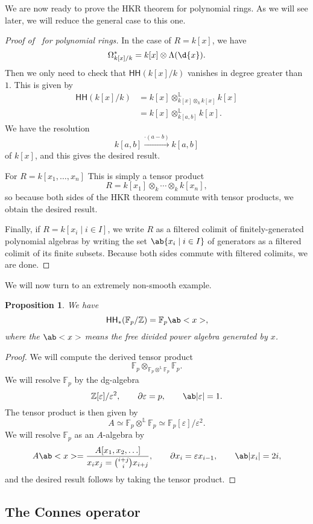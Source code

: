 \documentclass[10pt, oneside]{memoir}
\newtheorem{prop}[thm]{Proposition}
\theoremstyle{definition}
\theoremstyle{remark}
\theoremstyle{plain}
\theoremstyle{definition}
\theoremstyle{remark}
\newcommand{\Z}{\mathbb{Z}}
\newcommand{\F}{\mathbb{F}}
\renewcommand{\L}{\mathbb{L}}
\newcommand{\ep}{\varepsilon}
\newcommand{\ms}[1]{\mathsf{#1}}
\newcommand{\1}{\mathbf{1}}
\newcommand{\2}{\mathbf{2}}
\newcommand{\3}{\mathbf{3}}
\newcommand{\HH}{\ms{HH}}
\begin{document}
We are now ready to prove the HKR theorem for polynomial rings. As we will see later, we will reduce the general case to this one.
\begin{proof}[Proof of~ for polynomial rings]
    In the case of $R = k[x]$, we have
    \[ \Omega^*_{k[x]/k} = k[x] \otimes \Lambda(\d{x}). \]
    Then we only need to check that $\HH(k[x]/k)$ vanishes in degree greater than $1$. This is given by
    \begin{align*}
        \HH(k[x]/k) &= k[x] \otimes^{\L}_{k[x] \otimes_k k[x]} k[x] \\
        &= k[x] \otimes_{k[a,b]}^{\L} k[x].
    \end{align*}
    We have the resolution
    \[ k[a,b] \xrightarrow{\cdot (a-b)} k[a,b] \]
    of $k[x]$, and this gives the desired result.

    For \(R = k[x_1, \ldots, x_n]\) This is simply a tensor product
    \[ R = k[x_1] \otimes_k \cdots \otimes_k k[x_n], \]
    so because both sides of the HKR theorem commute with tensor products, we obtain the desired result.

    Finally, if \(R = k[x_i \mid i \in I]\), we write \(R\) as a filtered colimit of finitely-generated polynomial algebras by writing the set $\ab\{x_i \mid i \in I\}$ of generators as a filtered colimit of its finite subsets. Because both sides commute with filtered colimits, we are done.
\end{proof}

We will now turn to an extremely non-smooth example.
\begin{prop}
    We have
    \[ \HH_*(\F_p/\Z) = \F_p \ab<x>, \]
    where the $\ab<x>$ means the free divided power algebra generated by $x$.
\end{prop}

\begin{proof}
    We will compute the derived tensor product
    \[ \F_p \otimes_{\F_p \otimes^{\L} \F_p} \F_p. \]
    We will resolve $\F_p$ by the dg-algebra
    \[ \Z[\ep]/\ep^2, \qquad \partial \ep = p, \qquad \ab|\ep| = 1. \]
    The tensor product is then given by
    \[ A \simeq \F_p \otimes^{\L} \F_p \simeq \F_p[\ep]/\ep^2. \]
    We will resolve $\F_p$ as an $A$-algebra by
    \[ A\ab<x> = \frac{A[x_1, x_2, \ldots]}{x_ix_j = \binom{i+j}{i} x_{i+j}}, \qquad \partial x_i = \ep x_{i-1}, \qquad \ab|x_i| = 2i, \]
    and the desired result follows by taking the tensor product.
\end{proof}

\subsection{The Connes operator}%
\label{sub:The Connes operator}
\end{document}
